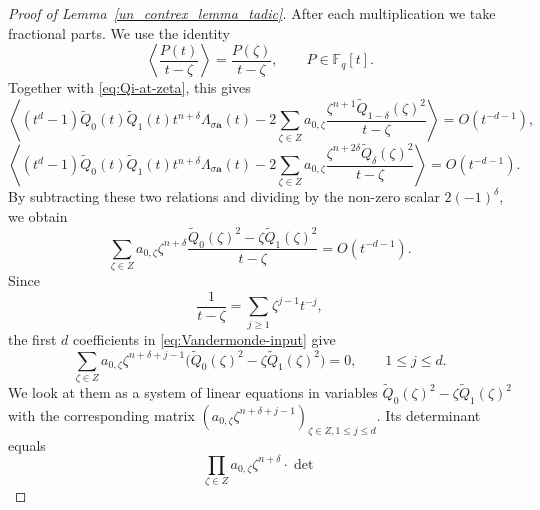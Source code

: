 \documentclass[10pt,a4paper]{amsart}
\begin{document}
\begin{proof}[Proof of Lemma~\ref{un_contrex_lemma_tadic}]
After each multiplication we take fractional parts.  We use the identity
\[
 \left\langle\frac{P(t)}{t-\zeta}\right\rangle
 =
 \frac{P(\zeta)}{t-\zeta},
 \qquad P\in\mathbb F_q[t].
\]
Together with \eqref{eq:Qi-at-zeta}, this gives
$$
\left\langle (t^d-1)\widetilde Q_0(t)\widetilde Q_1(t)
 t^{n+\delta}\Lambda_{\sigma\mathbf a}(t) - 2 \sum_{\zeta\in Z}
 a_{0,\zeta}
 \frac{\zeta^{n+1}\widetilde Q_{1-\delta}(\zeta)^2}
      {t-\zeta}\right\rangle = O(t^{-d-1}),
$$
$$
\left\langle (t^d-1)\widetilde Q_0(t)\widetilde Q_1(t)
 t^{n+\delta}\Lambda_{\sigma\mathbf a}(t) - 2\sum_{\zeta\in Z}
 a_{0,\zeta}
 \frac{\zeta^{n+2\delta}\widetilde Q_\delta(\zeta)^2}
      {t-\zeta}
 \right\rangle  =O(t^{-d-1}).
$$
%
By subtracting these two relations and dividing by the non-zero
scalar $2(-1)^\delta$, we obtain
\begin{equation} \label{eq:Vandermonde-input}
 \sum_{\zeta\in Z}
 a_{0,\zeta}\zeta^{n+\delta}
 \frac{\widetilde Q_0(\zeta)^2
       -\zeta\widetilde Q_1(\zeta)^2}
      {t-\zeta}
 =O(t^{-d-1}).
\end{equation}
Since
\[
 \frac1{t-\zeta}=\sum_{j\geq1}\zeta^{j-1}t^{-j},
\]
the first $d$ coefficients in \eqref{eq:Vandermonde-input} give
\begin{equation} \label{eq:Vandermonde-system}
 \sum_{\zeta\in Z}
 a_{0,\zeta}\zeta^{n+\delta+j-1}
 \bigl(\widetilde Q_0(\zeta)^2
       -\zeta\widetilde Q_1(\zeta)^2\bigr)=0,
 \qquad 1\leq j\leq d.
\end{equation}
We look at them as a system of linear equations in variables
$\widetilde{Q}_0(\zeta)^2 - \zeta\widetilde{Q}_1(\zeta)^2$ with the
corresponding matrix $(a_{0,\zeta}\zeta^{n+\delta+j-1})_{\zeta\in Z,
1\le j\le d}$. Its determinant equals
$$
\prod_{\zeta\in Z} a_{0,\zeta}\zeta^{n+\delta} \cdot \det
$$
\end{proof}
\end{document}
